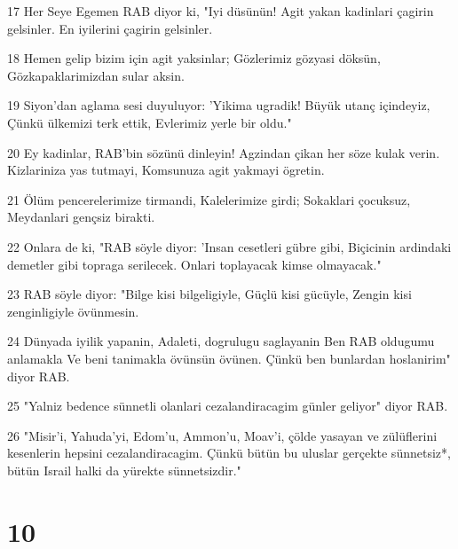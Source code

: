 \par 17 Her Seye Egemen RAB diyor ki, "Iyi düsünün! Agit yakan kadinlari çagirin gelsinler. En iyilerini çagirin gelsinler.
\par 18 Hemen gelip bizim için agit yaksinlar; Gözlerimiz gözyasi döksün, Gözkapaklarimizdan sular aksin.
\par 19 Siyon'dan aglama sesi duyuluyor: 'Yikima ugradik! Büyük utanç içindeyiz, Çünkü ülkemizi terk ettik, Evlerimiz yerle bir oldu."
\par 20 Ey kadinlar, RAB'bin sözünü dinleyin! Agzindan çikan her söze kulak verin. Kizlariniza yas tutmayi, Komsunuza agit yakmayi ögretin.
\par 21 Ölüm pencerelerimize tirmandi, Kalelerimize girdi; Sokaklari çocuksuz, Meydanlari gençsiz birakti.
\par 22 Onlara de ki, "RAB söyle diyor: 'Insan cesetleri gübre gibi, Biçicinin ardindaki demetler gibi topraga serilecek. Onlari toplayacak kimse olmayacak."
\par 23 RAB söyle diyor: "Bilge kisi bilgeligiyle, Güçlü kisi gücüyle, Zengin kisi zenginligiyle övünmesin.
\par 24 Dünyada iyilik yapanin, Adaleti, dogrulugu saglayanin Ben RAB oldugumu anlamakla Ve beni tanimakla övünsün övünen. Çünkü ben bunlardan hoslanirim" diyor RAB.
\par 25 "Yalniz bedence sünnetli olanlari cezalandiracagim günler geliyor" diyor RAB.
\par 26 "Misir'i, Yahuda'yi, Edom'u, Ammon'u, Moav'i, çölde yasayan ve zülüflerini kesenlerin hepsini cezalandiracagim. Çünkü bütün bu uluslar gerçekte sünnetsiz*, bütün Israil halki da yürekte sünnetsizdir."

\chapter{10}

